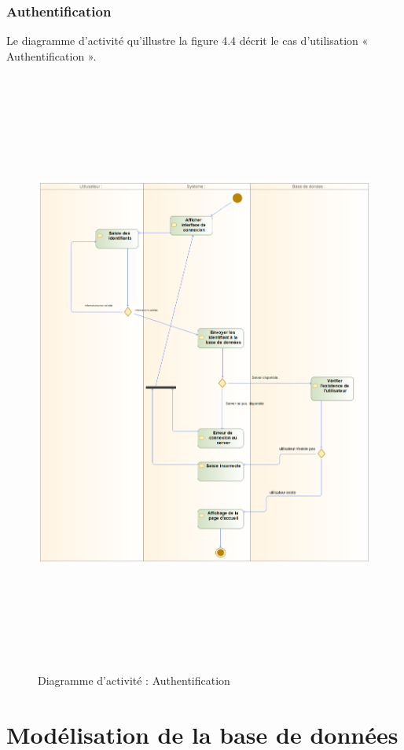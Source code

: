 \subsubsection{Authentification}
Le diagramme d’activité qu’illustre la figure 4.4 décrit le cas d’utilisation « Authentification ».
\begin{figure}[h!]
	\includegraphics[width=18cm, height=20cm]{./Template LaTeX/Images/auth_act.png}
	\caption{Diagramme d'activité : Authentification}
	\label{fig3:activite}
\end{figure}


\section{Modélisation de la base de données}

